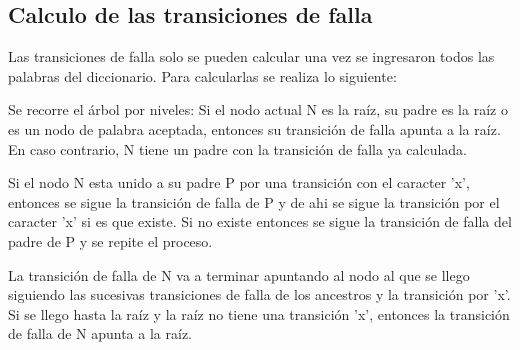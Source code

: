 \documentclass{article}
\begin{document}
\subsection*{Calculo de las transiciones de falla}

Las transiciones de falla solo se pueden calcular una vez se ingresaron todos las palabras del diccionario. Para calcularlas se realiza lo siguiente:

Se recorre el árbol por niveles:
    Si el nodo actual N es la raíz, su padre es la raíz o es un nodo de palabra aceptada, entonces su transición de falla apunta a la raíz.
    En caso contrario, N tiene un padre con la transición de falla ya calculada.

    Si el nodo N esta unido a su padre P por una transición con el caracter 'x', entonces se sigue la transición de falla de P y de ahi
    se sigue la transición por el caracter 'x' si es que existe. Si no existe entonces se sigue la transición de falla del padre de P y se repite el proceso.

    La transición de falla de N va a terminar apuntando al nodo al que se llego siguiendo las sucesivas transiciones de falla de los ancestros y la transición por 'x'.
    Si se llego hasta la raíz y la raíz no tiene una transición 'x', entonces la transición de falla de N apunta a la raíz.
\end{document}

